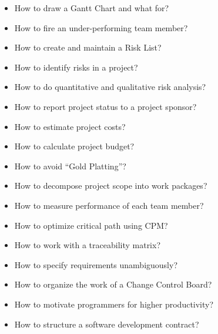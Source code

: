 \documentclass[nobrand,anonymous,nodate,nosecurity]{huawei}
\begin{document}
{\begin{itemize}
\item How to draw a Gantt Chart and what for?
\item How to fire an under-performing team member?
\item How to create and maintain a Risk List?
\item How to identify risks in a project?
\item How to do quantitative and qualitative risk analysis?
\item How to report project status to a project sponsor?
\item How to estimate project costs?
\item How to calculate project budget?
\item How to avoid ``Gold Platting''?
\item How to decompose project scope into work packages?
\item How to measure performance of each team member?
\item How to optimize critical path using CPM?
\item How to work with a traceability matrix?
\item How to specify requirements unambiguously?
\item How to organize the work of a Change Control Board?
\item How to motivate programmers for higher productivity?
\item How to structure a software development contract?
\end{itemize}




}
\end{document}
